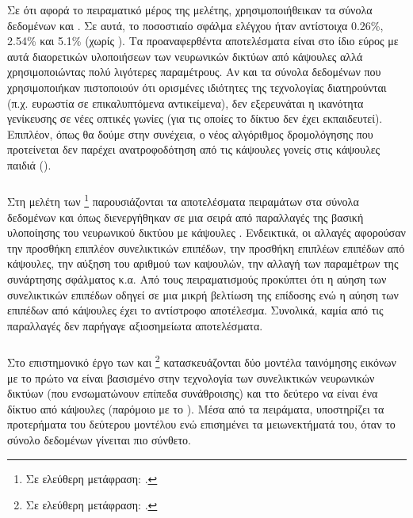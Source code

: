  Σε ότι αφορά το πειραματικό μέρος της μελέτης, χρησιμοποιήθεικαν τα σύνολα δεδομένων  και . Σε αυτά, το ποσοστιαίο σφάλμα ελέγχου ήταν αντίστοιχα 0.26\%, 2.54\% και 5.1\% (χωρίς ). Τα προαναφερθέντα αποτελέσματα είναι στο ίδιο εύρος με αυτά διαορετικών υλοποιήσεων των νευρωνικών δικτύων από κάψουλες αλλά χρησιμοποιώντας πολύ λιγότερες παραμέτρους. Αν και τα σύνολα δεδομένων που χρησιμοποιήκαν πιστοποιούν ότι ορισμένες ιδιότητες της τεχνολογίας διατηρούνται (π.χ. ευρωστία σε επικαλυπτόμενα αντικείμενα), δεν εξερευνάται η ικανότητα γενίκευσης σε νέες οπτικές γωνίες (για τις οποίες το δίκτυο δεν έχει εκπαιδευτεί). Επιπλέον, όπως θα δούμε στην συνέχεια, ο νέος αλγόριθμος δρομολόγησης που προτείνεται δεν παρέχει ανατροφοδότηση από τις κάψουλες γονείς στις κάψουλες παιδιά ().

 \subsubsection{}

Στη μελέτη των  \footnote{Σε ελεύθερη μετάφραση: .} \cite{xi2017capsule} παρουσιάζονται τα αποτελέσματα πειραμάτων στα σύνολα δεδομένων  και  όπως διενεργήθηκαν σε μια σειρά από παραλλαγές της βασική υλοποίησης του νευρωνικού δικτύου με κάψουλες \cite{sabour2017dynamic}. Ενδεικτικά, οι αλλαγές αφορούσαν την προσθήκη επιπλέον συνελικτικών επιπέδων, την προσθήκη επιπλέων επιπέδων από κάψουλες, την αύξηση του αριθμού των καψουλών, την αλλαγή των παραμέτρων της συνάρτησης σφάλματος κ.α. Από τους πειραματισμούς προκύπτει ότι η αύηση των συνελικτικών επιπέδων οδηγεί σε μια μικρή βελτίωση της επίδοσης ενώ η αύηση των επιπέδων από κάψουλες έχει το αντίστροφο αποτέλεσμα. Συνολικά, καμία από τις παραλλαγές δεν παρήγαγε αξιοσημείωτα αποτελέσματα.

\subsubsection{}

Στο επιστημονικό έργο των  και  \footnote{Σε ελεύθερη μετάφραση: .} \cite{dong2019research} κατασκευάζονται δύο μοντέλα ταινόμησης εικόνων με το πρώτο να είναι βασισμένο στην τεχνολογία των  συνελικτικών νευρωνικών δικτύων (που ενσωματώνουν επίπεδα συνάθροισης) και ττο δεύτερο να είναι ένα δίκτυο από κάψουλες (παρόμοιο με το \cite{sabour2017dynamic}). Μέσα από τα πειράματα, υποστηρίζει τα προτερήματα του δεύτερου μοντέλου ενώ επισημένει τα μειωνεκτήματά του, όταν το σύνολο δεδομένων γίνειται πιο σύνθετο. 

